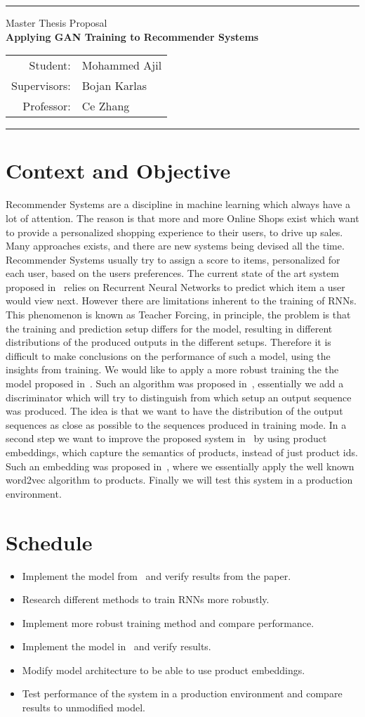 \documentclass[12pt]{scrartcl}
\makeatletter
\renewcommand{\maketitle}
  {\setlength{\unitlength}{1mm}
  \begin{minipage}{\textwidth}
    \ETHlogo[55mm]\hfill%
  \end{minipage}
  \begin{center}
    {\color{Gray} \rule{.8\textwidth}{.5pt}}
  \end{center}
  \begin{center}
    {\Large Master Thesis Proposal}\\
    \vspace{10pt}
    {\huge \textbf {Applying GAN Training to Recommender Systems}}\\
    \vspace{7pt}
    \begin{tabular}{rl}
      Student: & Mohammed Ajil \\
      Supervisors: &  Bojan Karlas \\
      Professor: & Ce Zhang \\
    \end{tabular}
    \vspace{-2pt}
  \end{center}

  \begin{center}
    {\color{Gray} \rule{.8\textwidth}{.5pt}}
  \end{center}
}
\makeatother
\begin{document}
\maketitle

\section{Context and Objective}
Recommender Systems are a discipline in machine learning which always have a lot of attention. The reason is that more and more Online Shops exist which want to provide a personalized shopping experience to their users, to drive up sales.
%
Many approaches exists, and there are new systems being devised all the time.
%
Recommender Systems usually try to assign a score to items, personalized for each user, based on the users preferences.
%
The current state of the art system proposed in~\cite{hierarchical} relies on Recurrent Neural Networks to predict which item a user would view next.
%
However there are limitations inherent to the training of RNNs.
%
This phenomenon is known as Teacher Forcing, in principle, the problem is that the training and prediction setup differs for the model, resulting in different distributions of the produced outputs in the different setups.
%
Therefore it is difficult to make conclusions on the performance of such a model, using the insights from training.
%
We would like to apply a more robust training the the model proposed in~\cite{hierarchical}.
%
Such an algorithm was proposed in~\cite{profforce}, essentially we add a discriminator which will try to distinguish from which setup an output sequence was produced.
%
The idea is that we want to have the distribution of the output sequences as close as possible to the sequences produced in training mode.
%
In a second step we want to improve the proposed system in~\cite{hierarchical} by using product embeddings, which capture the semantics of products, instead of just product ids.
%
Such an embedding was proposed in~\cite{prod2vec}, where we essentially apply the well known word2vec algorithm to products.
%
Finally we will test this system in a production environment.
%
\section{Schedule}
%
\begin{itemize}
 \item Implement the model from~\cite{hierarchical} and verify results from the paper.
 \item Research different methods to train RNNs more robustly.
 \item Implement more robust training method and compare performance.
 \item Implement the model in~\cite{prod2vec} and verify results.
 \item Modify model architecture to be able to use product embeddings.
 \item Test performance of the system in a production environment and compare results to unmodified model.
\end{itemize}
%
\end{document}
